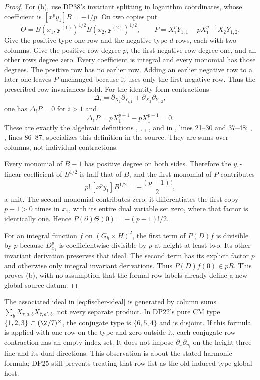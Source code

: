 \begin{proof}
For (b), use DP38's invariant splitting in logarithm coordinates, whose coefficient is $[x^py_1]B=-1/p$. On two copies put
\[
 \Theta=B(x_1,\mathbf y^{(1)})^{1/2}B(x_2,\mathbf y^{(2)})^{1/2},\qquad
 P=X_1^pY_{1,1}-pX_1^{p-1}X_2Y_{1,2}.
\]
Give the positive type one row and the negative type $d$ rows, each with two columns. Give the positive row degree $p$, the first negative row degree one, and all other rows degree zero. Every coefficient is integral and every monomial has those degrees. The positive row has no earlier row. Adding an earlier negative row to a later one leaves $P$ unchanged because it uses only the first negative row. Thus the prescribed row invariances hold. For the identity-form contractions
\[
 \Delta_i=\partial_{X_1}\partial_{Y_{i,1}}+
          \partial_{X_2}\partial_{Y_{i,2}},
\]
one has $\Delta_iP=0$ for $i>1$ and
\[
 \Delta_1P=pX_1^{p-1}-pX_1^{p-1}=0.
\]
These are exactly the algebraic definitions , , , , and  in
,
lines 21--30 and 37--48; , , lines 86--87, specializes this definition in the source. They are sums over columns, not individual contractions.

Every monomial of $B-1$ has positive degree on both sides. Therefore the $y_1$-linear coefficient of $B^{1/2}$ is half that of $B$, and the first monomial of $P$ contributes
\[
 p!\,[x^py_1]B^{1/2}=-\frac{(p-1)!}{2},
\]
a unit. The second monomial contributes zero: it differentiates the first copy $p-1>0$ times in $x_1$, with its entire dual variable set zero, where that factor is identically one. Hence $P(\partial)\Theta(0)=-(p-1)!/2$.

For an integral function $f$ on $(G_h\times H)^2$, the first term of $P(D)f$ is divisible by $p$ because $D_{x_1}^p$ is coefficientwise divisible by $p$ at height at least two. Its other invariant derivation preserves that ideal. The second term has its explicit factor $p$ and otherwise only integral invariant derivations. Thus $P(D)f(0)\in pR$. This proves (b), with no assumption that the formal row labels already define a new global source datum.
\end{proof}

The associated ideal in \eqref{eq:fischer-ideal} is generated by column sums $\sum_bX_{\tau,a,b}X_{\bar\tau,a',b}$, not every separate product. In DP22's pure CM type $\{1,2,3\}\subset(\Z/7)^\times$, the conjugate type is $\{6,5,4\}$ and is disjoint. If this formula is applied with one row on the type and zero outside it, each conjugate-row contraction has an empty index set. It does not impose $\partial_x\partial_{y_i}$ on the height-three line and its dual directions. This observation is about the stated harmonic formula; DP25 still prevents treating that row list as the old induced-type global host.

